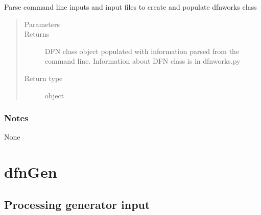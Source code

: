 \documentclass[letterpaper,10pt,english]{sphinxmanual}
\begin{document}

\begin{fulllineitems}
\label{\detokenize{pydfnworks:pydfnworks.general.dfnworks.create_dfn}}
Parse command line inputs and input files to create and populate dfnworks class
\begin{quote}\begin{description}
\item[{Parameters}] \leavevmode
{} \textendash{} 

\item[{Returns}] \leavevmode
{} \textendash{} DFN class object populated with information parsed from the command line. Information about DFN class is in dfnworks.py

\item[{Return type}] \leavevmode
object

\end{description}\end{quote}
\subsubsection*{Notes}

None

\end{fulllineitems}



\section{dfnGen}
\label{\detokenize{pydfnworks:dfngen}}

\subsection{Processing generator input}
\label{\detokenize{pydfnworks:module-pydfnworks.dfnGen.gen_input}}\label{\detokenize{pydfnworks:processing-generator-input}}
\end{document}
